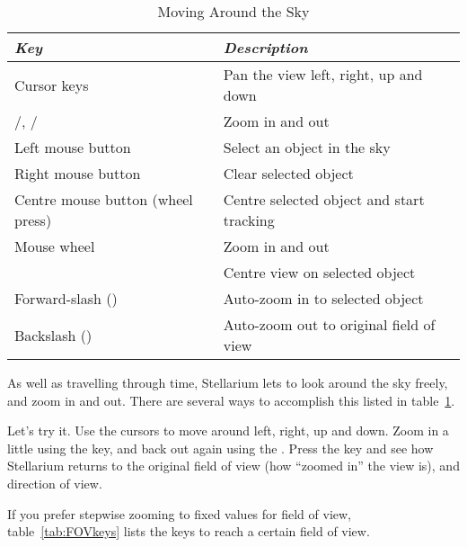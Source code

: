 \begin{table}[h]
\centering
\begin{tabular}{ll}\toprule
\emph{Key}                         & \emph{Description}\\\midrule
Cursor keys \keys{\arrowkeyleft} \keys{\arrowkeyright} \keys{\arrowkeyup} \keys{\arrowkeydown} & Pan the view left, right, up and down \\
\keyPageUp{}/\keyPageDown{}, \keys{\ctrl+\arrowkeyup}/\keys{\ctrl+\arrowkeydown} & Zoom in and out \\
Left mouse button                  & Select an object in the sky \\
Right mouse button                 & Clear selected object \\
Centre mouse button (wheel press)  & Centre selected object and start tracking \\
Mouse wheel                        & Zoom in and out \\ 
\key{\space}                       & Centre view on selected object \\
Forward-slash (\key{/})            & Auto-zoom in to selected object \\
Backslash (\key{\textbackslash{}}) & Auto-zoom out to original field of view \\
\bottomrule
\end{tabular}
\caption{Moving Around the Sky}
\label{tab:tour:moving}
\end{table}

As well as travelling through time, Stellarium lets to look around the
sky freely, and zoom in and out. There are several ways to accomplish
this listed in table~\ref{tab:tour:moving}.

Let's try it. Use the cursors to move around left, right, up and down.
Zoom in a little using the \keyPageUp{} key, and back out again using the
\keyPageDown{}. Press the \key{\textbackslash} key and see how Stellarium returns to the
original field of view (how ``zoomed in'' the view is), and direction of
view.

If you prefer stepwise zooming to fixed values for field of view,
table~\ref{tab:FOVkeys} lists the keys to reach a certain field of
view.

